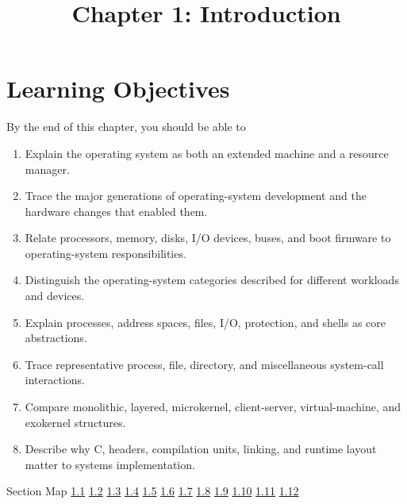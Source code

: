 \documentclass[10pt,letterpaper]{article}
\title{Chapter 1: Introduction}
\author{}
\date{}
\begin{document}
\maketitle
\section*{Learning Objectives}
\begin{studybox}{By the end of this chapter, you should be able to}
\begin{enumerate}
  \item Explain the operating system as both an extended machine and a resource manager.
  \item Trace the major generations of operating-system development and the hardware changes that enabled them.
  \item Relate processors, memory, disks, I/O devices, buses, and boot firmware to operating-system responsibilities.
  \item Distinguish the operating-system categories described for different workloads and devices.
  \item Explain processes, address spaces, files, I/O, protection, and shells as core abstractions.
  \item Trace representative process, file, directory, and miscellaneous system-call interactions.
  \item Compare monolithic, layered, microkernel, client-server, virtual-machine, and exokernel structures.
  \item Describe why C, headers, compilation units, linking, and runtime layout matter to systems implementation.
\end{enumerate}
\end{studybox}

\begin{studybox}{Section Map}
\hyperlink{sec-1-1}{1.1} \quad \hyperlink{sec-1-2}{1.2} \quad \hyperlink{sec-1-3}{1.3} \quad \hyperlink{sec-1-4}{1.4} \quad \hyperlink{sec-1-5}{1.5} \quad \hyperlink{sec-1-6}{1.6} \quad \hyperlink{sec-1-7}{1.7} \quad \hyperlink{sec-1-8}{1.8} \quad \hyperlink{sec-1-9}{1.9} \quad \hyperlink{sec-1-10}{1.10} \quad \hyperlink{sec-1-11}{1.11} \quad \hyperlink{sec-1-12}{1.12}
\end{studybox}
\end{document}
